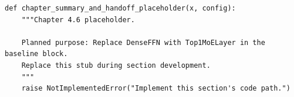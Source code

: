 \begin{lstlisting}[style=bookpython,caption={Planned code placeholder for chapter summary and handoff.},label={lst:ch04-chapter-summary-and-handoff}]
def chapter_summary_and_handoff_placeholder(x, config):
    """Chapter 4.6 placeholder.

    Planned purpose: Replace DenseFFN with Top1MoELayer in the baseline block.
    Replace this stub during section development.
    """
    raise NotImplementedError("Implement this section's code path.")
\end{lstlisting}
